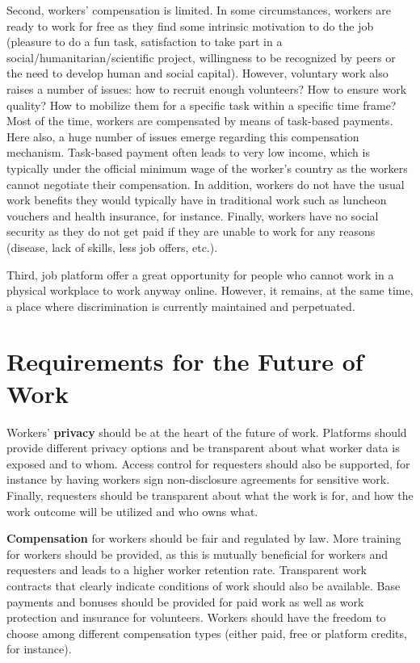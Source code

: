 \documentclass[11pt]{article}
\begin{document}
Second, workers’ compensation is limited. In some circumstances, workers are ready to work for free as they find some intrinsic motivation to do the job (pleasure to do a fun task, satisfaction to take part in a social/humanitarian/scientific project, willingness to be recognized by peers or the need to develop human and social capital). However, voluntary work also raises a number of issues: how to recruit enough volunteers? How to ensure work quality? How to mobilize them for a specific task within a specific time frame? 
% 
Most of the time, workers are compensated by means of task-based payments. Here also, a huge number of issues emerge regarding this compensation mechanism. Task-based payment often leads to very low income, which is typically under the official minimum wage of the worker’s country as the workers cannot negotiate their compensation. In addition, workers do not have the usual work benefits they would typically have in traditional work such as luncheon vouchers and health insurance, for instance. Finally, workers have no social security as they do not get paid if they are unable to work for any reasons (disease, lack of skills, less job offers, etc.). 

Third, job platform offer a great opportunity for people who cannot work in a physical workplace to work anyway online. However, it remains, at the same time, a place where discrimination is currently maintained and perpetuated. 


\section{Requirements for the Future of Work}
Workers’ \textbf{privacy} should be at the heart of the future of work. Platforms should provide different privacy options and be transparent about what worker data is exposed and to whom. Access control for requesters should also be supported, for instance by having workers sign non-disclosure agreements for sensitive work. Finally, requesters should be transparent about what the work is for, and how the work outcome will be utilized and who owns what. 

\textbf{Compensation} for workers should be fair and regulated by law. More training for workers should be provided, as this is mutually beneficial for workers and requesters and leads to a higher worker retention rate. Transparent work contracts  that clearly indicate conditions of work should also be available. Base payments and bonuses should be provided for paid work as well as work protection and insurance for volunteers. Workers should have the freedom to choose among different compensation types (either paid, free or platform credits, for instance).  
\end{document}
